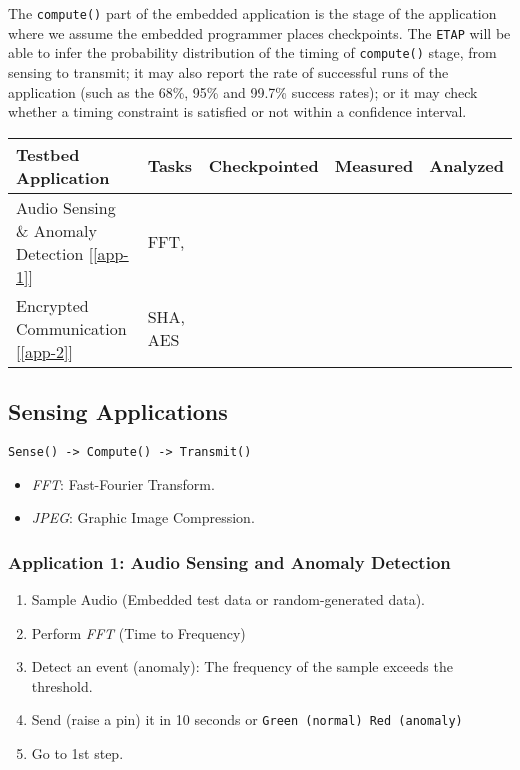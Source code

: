\documentclass[]{article}
\providecommand{\tightlist}{%
  \setlength{\itemsep}{0pt}\setlength{\parskip}{0pt}}
\begin{document}
The \texttt{compute()} part of the embedded application is the stage of the application where we assume the embedded programmer places checkpoints. The \texttt{ETAP} will be able to infer the probability distribution of the timing of \texttt{compute()} stage, from sensing to transmit; it may also report the rate of successful runs of the application (such as the 68\%, 95\% and 99.7\% success rates); or it may check whether a timing constraint is satisfied or not within a confidence interval.

\begin{longtable}[]{@{}llccc@{}}
\toprule
Testbed Application & Tasks & Checkpointed & Measured & Analyzed\tabularnewline
\midrule
\endhead
Audio Sensing \& Anomaly Detection {[}\ref{app-1}{]} & FFT, & & &\tabularnewline
Encrypted Communication {[}\ref{app-2}{]} & SHA, AES & & &\tabularnewline
\bottomrule
\end{longtable}

\hypertarget{sensing-applications}{%
\subsection{Sensing Applications}\label{sensing-applications}}

\texttt{Sense()\ -\textgreater{}\ Compute()\ -\textgreater{}\ Transmit()}

\begin{itemize}
\tightlist
\item
  \emph{FFT}: Fast-Fourier Transform.
\item
  \emph{JPEG}: Graphic Image Compression.
\end{itemize}

\hypertarget{app-1}{%
\subsubsection*{Application 1: Audio Sensing and Anomaly Detection}\label{app-1}}

\begin{enumerate}
\def\labelenumi{\arabic{enumi}.}
\tightlist
\item
  Sample Audio (Embedded test data or random-generated data).
\item
  Perform \emph{FFT} (Time to Frequency)
\item
  Detect an event (anomaly): The frequency of the sample exceeds the threshold.
\item
  Send (raise a pin) it in 10 seconds or \texttt{Green\ (normal)\ Red\ (anomaly)}
\item
  Go to 1st step.
\end{enumerate}
\end{document}
